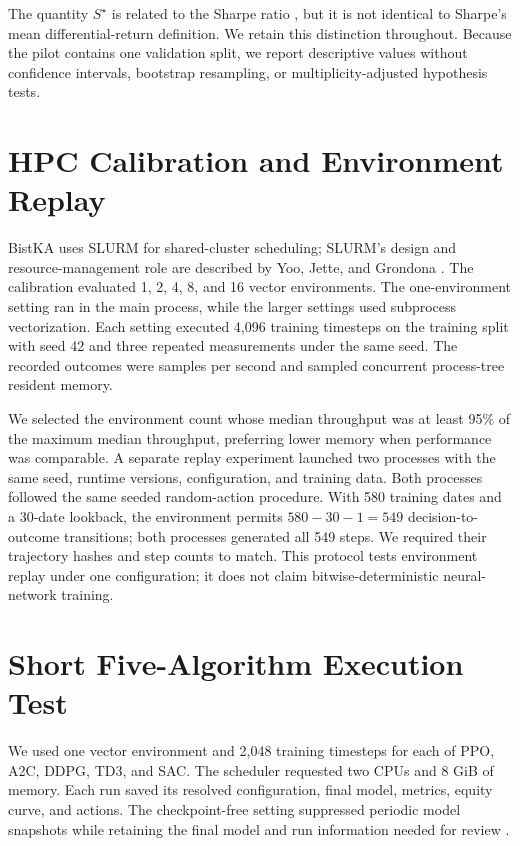 \documentclass[12pt,a4paper,oneside]{book}
\theoremstyle{plain}
\numberwithin{equation}{chapter} \DeclareMathOperator{\Var}{Var}
\begin{document}
The quantity $S^\star$ is related to the Sharpe ratio \cite{sharpe1994}, but it is not identical to Sharpe's mean differential-return definition. We retain this distinction throughout. Because the pilot contains one validation split, we report descriptive values without confidence intervals, bootstrap resampling, or multiplicity-adjusted hypothesis tests.

\section{HPC Calibration and Environment Replay}

BistKA uses SLURM for shared-cluster scheduling; SLURM's design and resource-management role are described by Yoo, Jette, and Grondona \cite{yoo2003slurm}. The calibration evaluated 1, 2, 4, 8, and 16 vector environments. The one-environment setting ran in the main process, while the larger settings used subprocess vectorization. Each setting executed 4,096 training timesteps on the training split with seed 42 and three repeated measurements under the same seed. The recorded outcomes were samples per second and sampled concurrent process-tree resident memory.

We selected the environment count whose median throughput was at least 95\% of the maximum median throughput, preferring lower memory when performance was comparable. A separate replay experiment launched two processes with the same seed, runtime versions, configuration, and training data. Both processes followed the same seeded random-action procedure. With 580 training dates and a 30-date lookback, the environment permits $580-30-1=549$ decision-to-outcome transitions; both processes generated all 549 steps. We required their trajectory hashes and step counts to match. This protocol tests environment replay under one configuration; it does not claim bitwise-deterministic neural-network training.

\section{Short Five-Algorithm Execution Test}

We used one vector environment and 2,048 training timesteps for each of PPO, A2C, DDPG, TD3, and SAC. The scheduler requested two CPUs and 8 GiB of memory. Each run saved its resolved configuration, final model, metrics, equity curve, and actions. The checkpoint-free setting suppressed periodic model snapshots while retaining the final model and run information needed for review \cite{sandve2013reproducible,henderson2018drl}.
\end{document}
